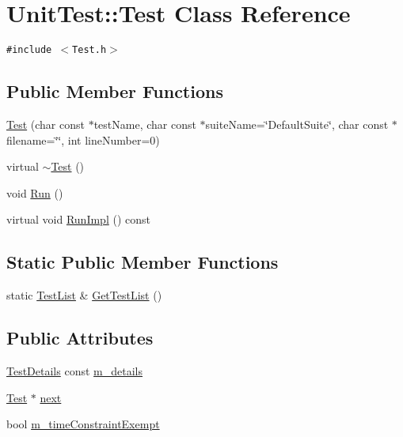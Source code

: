 \hypertarget{class_unit_test_1_1_test}{
\section{UnitTest::Test Class Reference}
\label{class_unit_test_1_1_test}
}
{\tt \#include $<$Test.h$>$}

\subsection*{Public Member Functions}
\begin{CompactItemize}
\item 
\hyperlink{class_unit_test_1_1_test_8c9765840746f8ddae4a2a52e0a50ec1}{Test} (char const $\ast$testName, char const $\ast$suiteName=\char`\"{}DefaultSuite\char`\"{}, char const $\ast$filename=\char`\"{}\char`\"{}, int lineNumber=0)
\item 
virtual \hyperlink{class_unit_test_1_1_test_6fa9104f0b5b8c880e98a125e26c4989}{$\sim$Test} ()
\item 
void \hyperlink{class_unit_test_1_1_test_8b266c253b945d9552c56012a96a55a2}{Run} ()
\item 
virtual void \hyperlink{class_unit_test_1_1_test_faf8822de5354d2f1027c7ea2f7a1030}{RunImpl} () const 
\end{CompactItemize}
\subsection*{Static Public Member Functions}
\begin{CompactItemize}
\item 
static \hyperlink{class_unit_test_1_1_test_list}{TestList} \& \hyperlink{class_unit_test_1_1_test_3e26319f255cd4919d5de1bbdf5b62b6}{GetTestList} ()
\end{CompactItemize}
\subsection*{Public Attributes}
\begin{CompactItemize}
\item 
\hyperlink{class_unit_test_1_1_test_details}{TestDetails} const \hyperlink{class_unit_test_1_1_test_e990920e048b41738394132fe985c452}{m\_\-details}
\item 
\hyperlink{class_unit_test_1_1_test}{Test} $\ast$ \hyperlink{class_unit_test_1_1_test_f14837fa08df9cdedb560b4deadec8a4}{next}
\item 
bool \hyperlink{class_unit_test_1_1_test_a9da2047fed156c74d97c89c4beb7663}{m\_\-timeConstraintExempt}
\end{CompactItemize}


